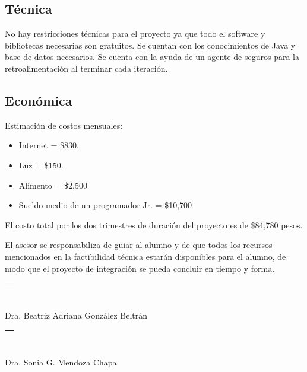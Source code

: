 \subsection*{Técnica}
No hay restricciones técnicas para el proyecto ya que todo el software y bibliotecas necesarias son gratuitos. Se cuentan con los conocimientos de Java y base de datos necesarios.
Se cuenta con la ayuda de un agente de seguros para la retroalimentación al terminar cada iteración.

\subsection*{Económica}
Estimación de costos mensuales:

\begin{itemize}
	\item Internet = \$830.
	\item Luz = \$150.
	\item Alimento = \$2,500
	\item Sueldo medio de un programador Jr. = \$10,700
\end{itemize}

El costo total por los dos trimestres de duración del proyecto es de \$84,780 pesos.

El asesor se responsabiliza de guiar al alumno y de que todos los recursos mencionados en la factibilidad técnica estarán disponibles para el alumno, de modo que el proyecto
de integración se pueda concluir en tiempo y forma.\\[2cm]

\begin{center}
	\begin{minipage}{0.4\textwidth}
		\centering
		\begin{tabular}{l}
			\makebox[5cm]{\hrulefill}
		\end{tabular}\\
		Dra. Beatriz Adriana González Beltrán%
	\end{minipage}
	\begin{minipage}{0.4\textwidth}
		\centering
		\begin{tabular}{l}
			\makebox[5cm]{\hrulefill}
		\end{tabular}\\
		Dra. Sonia G. Mendoza Chapa%
	\end{minipage}
\end{center}


